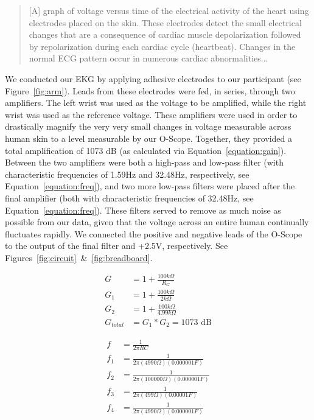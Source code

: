 \documentclass[11pt]{article}
\begin{document}
\begin{quote}
    [A] graph of voltage versus time of the electrical activity of the heart using electrodes placed on the skin. These electrodes detect the small electrical changes that are a consequence of cardiac muscle depolarization followed by repolarization during each cardiac cycle (heartbeat). Changes in the normal ECG pattern occur in numerous cardiac abnormalities...
\end{quote}

We conducted our EKG by applying adhesive electrodes to our participant (see Figure~\ref{fig:arm}). Leads from these electrodes were fed, in series, through two amplifiers. The left wrist was used as the voltage to be amplified, while the right wrist was used as the reference voltage. These amplifiers were used in order to drastically magnify the very very small changes in voltage measurable across human skin to a level measurable by our O-Scope. Together, they provided a total amplification of 1073 dB (as calculated via Equation~\ref{equation:gain}). Between the two amplifiers were both a high-pass and low-pass filter (with characteristic frequencies of 1.59Hz and 32.48Hz, respectively, see Equation~\ref{equation:freq}), and two more low-pass filters were placed after the final amplifier (both with characteristic frequencies of 32.48Hz, see Equation~\ref{equation:freq}). These filters served to remove as much noise as possible from our data, given that the voltage across an entire human continually fluctuates rapidly. We connected the positive and negative leads of the O-Scope to the output of the final filter and +2.5V, respectively. See Figures~\ref{fig:circuit}~\&~\ref{fig:breadboard}.

\begin{equation} \label{equation:gain}
\begin{split}
    G &= 1 + \frac{100k\Omega}{R_G} \\
    G_1 &= 1 + \frac{100k\Omega}{2k\Omega} \\
    G_2 &= 1 + \frac{100k\Omega}{4.99k\Omega} \\
    G_{total} &= G_1 * G_2 = 1073\text{ dB}
\end{split}
\end{equation}

\begin{equation} \label{equation:freq}
\begin{split}
    f &= \frac{1}{2\pi R C} \\
    f_1 &= \frac{1}{2\pi(4990\Omega)(0.000001F)} \\
    f_2 &= \frac{1}{2\pi(100000\Omega)(0.000001F)} \\
    f_3 &= \frac{1}{2\pi(499\Omega)(0.00001F)} \\
    f_4 &= \frac{1}{2\pi(4990\Omega)(0.000001F)}
\end{split}
\end{equation}
\end{document}
